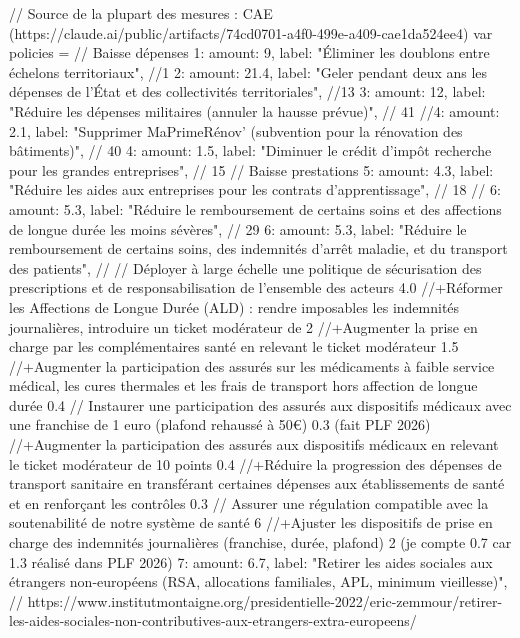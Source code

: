 	// Source de la plupart des mesures : CAE (https://claude.ai/public/artifacts/74cd0701-a4f0-499e-a409-cae1da524ee4)
	var policies = {
		// Baisse dépenses
		1:  { amount: 9,    label: "Éliminer les doublons entre échelons territoriaux"}, //1
		2: { amount: 21.4, label: "Geler pendant deux ans les dépenses de l'État et des collectivités territoriales"}, //13
		3: { amount: 12,   label: "Réduire les dépenses militaires (annuler la hausse prévue)"}, // 41
		//4: { amount: 2.1,  label: "Supprimer MaPrimeRénov' (subvention pour la rénovation des bâtiments)"}, // 40
		4: { amount: 1.5,  label: "Diminuer le crédit d'impôt recherche pour les grandes entreprises"}, // 15
		// Baisse prestations
		5: { amount: 4.3,  label: "Réduire les aides aux entreprises pour les contrats d'apprentissage"}, // 18
		// 6: { amount: 5.3,  label: "Réduire le remboursement de certains soins et des affections de longue durée les moins sévères"}, // 29
		6: { amount: 5.3,  label: "Réduire le remboursement de certains soins, des indemnités d'arrêt maladie, et du transport des patients"}, // 
		// Déployer à large échelle une politique de sécurisation des prescriptions et de responsabilisation de l'ensemble des acteurs 4.0
		//+Réformer les Affections de Longue Durée (ALD) : rendre imposables les indemnités journalières, introduire un ticket modérateur de 2%
		//+Augmenter la prise en charge par les complémentaires santé en relevant le ticket modérateur 1.5
		//+Augmenter la participation des assurés sur les médicaments à faible service médical, les cures thermales et les frais de transport hors affection de longue durée 0.4
		// Instaurer une participation des assurés aux dispositifs médicaux avec une franchise de 1 euro (plafond rehaussé à 50€) 0.3 (fait PLF 2026)
		//+Augmenter la participation des assurés aux dispositifs médicaux en relevant le ticket modérateur de 10 points 0.4
		//+Réduire la progression des dépenses de transport sanitaire en transférant certaines dépenses aux établissements de santé et en renforçant les contrôles 0.3
		// Assurer une régulation compatible avec la soutenabilité de notre système de santé 6
		//+Ajuster les dispositifs de prise en charge des indemnités journalières (franchise, durée, plafond) 2 (je compte 0.7 car 1.3 réalisé dans PLF 2026)
		7: { amount: 6.7,  label: "Retirer les aides sociales aux étrangers non-européens (RSA, allocations familiales, APL, minimum vieillesse)"}, // https://www.institutmontaigne.org/presidentielle-2022/eric-zemmour/retirer-les-aides-sociales-non-contributives-aux-etrangers-extra-europeens/ 
}
